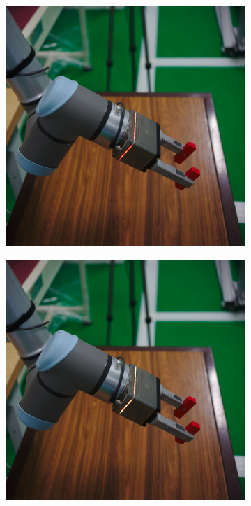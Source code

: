 \begin{figure}[h]
\begin{subfigure}{.2\linewidth}
      \includegraphics[width=.95\linewidth]{figs/chp5/grip_red.jpg}
    \end{subfigure}%
    \begin{subfigure}{.2\linewidth}
        \centering
        \includegraphics[width=.95\linewidth]{figs/chp5/grip_yellow.jpg}

\end{subfigure}
\end{figure}
